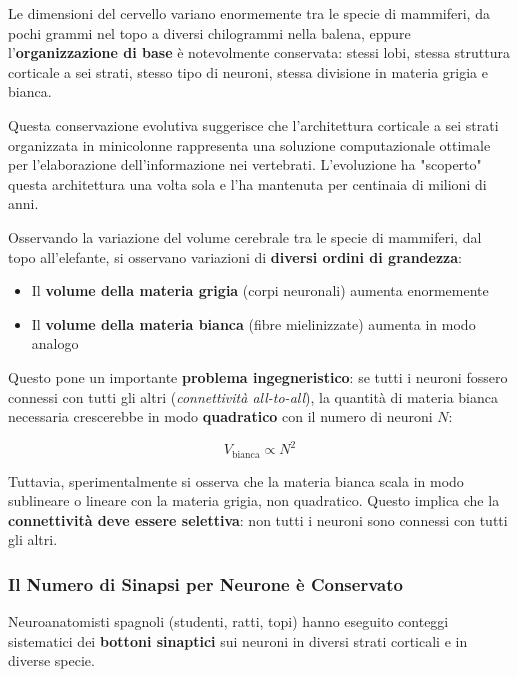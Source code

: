 Le dimensioni del cervello variano enormemente tra le specie di mammiferi, da pochi grammi nel topo a diversi chilogrammi nella balena, eppure l'\textbf{organizzazione di base} è notevolmente conservata: stessi lobi, stessa struttura corticale a sei strati, stesso tipo di neuroni, stessa divisione in materia grigia e bianca.

\begin{tcolorbox}[colback=gray!5, colframe=gray!40, arc=2mm, boxrule=0.5pt]
Questa conservazione evolutiva suggerisce che l'architettura corticale a sei strati organizzata in minicolonne rappresenta una soluzione computazionale ottimale per l'elaborazione dell'informazione nei vertebrati. L'evoluzione ha "scoperto" questa architettura una volta sola e l'ha mantenuta per centinaia di milioni di anni.
\end{tcolorbox}

Osservando la variazione del volume cerebrale tra le specie di mammiferi, dal topo all'elefante, si osservano variazioni di \textbf{diversi ordini di grandezza}:

\begin{itemize}
    \item Il \textbf{volume della materia grigia} (corpi neuronali) aumenta enormemente
    \item Il \textbf{volume della materia bianca} (fibre mielinizzate) aumenta in modo analogo
\end{itemize}

Questo pone un importante \textbf{problema ingegneristico}: se tutti i neuroni fossero connessi con tutti gli altri (\textit{connettività all-to-all}), la quantità di materia bianca necessaria crescerebbe in modo \textbf{quadratico} con il numero di neuroni $N$:

$$ V_{\text{bianca}} \propto N^2 $$

Tuttavia, sperimentalmente si osserva che la materia bianca scala in modo sublineare o lineare con la materia grigia, non quadratico. Questo implica che la \textbf{connettività deve essere selettiva}: non tutti i neuroni sono connessi con tutti gli altri.

\subsubsection{Il Numero di Sinapsi per Neurone è Conservato}

Neuroanatomisti spagnoli (studenti, ratti, topi) hanno eseguito conteggi sistematici dei \textbf{bottoni sinaptici} sui neuroni in diversi strati corticali e in diverse specie.

